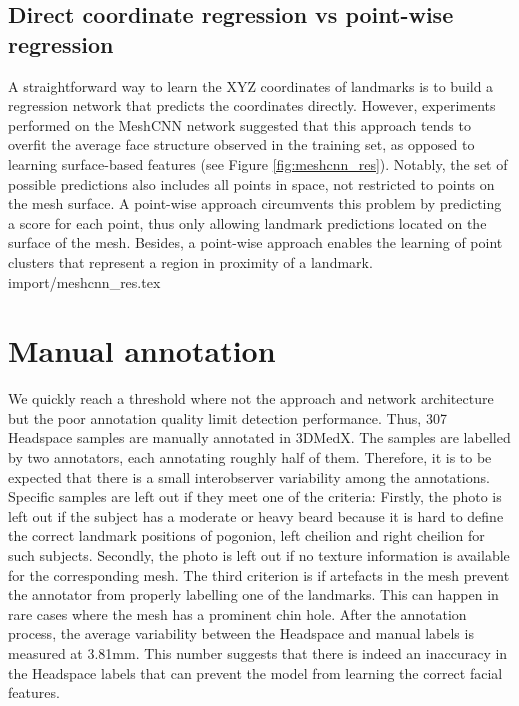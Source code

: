 \documentclass[class=article, crop=false]{standalone}
\begin{document}
\subsection{Direct coordinate regression vs point-wise regression}
\label{sec:coord_reg_vs_pw_reg}
A straightforward way to learn the XYZ coordinates of landmarks is to build a regression network that predicts the coordinates directly. However, experiments performed on the MeshCNN network suggested that this approach tends to overfit the average face structure observed in the training set, as opposed to learning surface-based features (see Figure \ref{fig:meshcnn_res}). Notably, the set of possible predictions also includes all points in space, not restricted to points on the mesh surface. A point-wise approach circumvents this problem by predicting a score for each point, thus only allowing landmark predictions located on the surface of the mesh. Besides, a point-wise approach enables the learning of point clusters that represent a region in proximity of a landmark.
{import/meshcnn_res.tex}



\section{Manual annotation}
\label{sec:app_manual_annotation}
We quickly reach a threshold where not the approach and network architecture but the poor annotation quality limit detection performance. Thus, 307 Headspace samples are manually annotated in 3DMedX. The samples are labelled by two annotators, each annotating roughly half of them. Therefore, it is to be expected that there is a small interobserver variability among the annotations. Specific samples are left out if they meet one of the criteria: Firstly, the photo is left out if the subject has a moderate or heavy beard because it is hard to define the correct landmark positions of pogonion, left cheilion and right cheilion for such subjects. Secondly, the photo is left out if no texture information is available for the corresponding mesh. The third criterion is if artefacts in the mesh prevent the annotator from properly labelling one of the landmarks. This can happen in rare cases where the mesh has a prominent chin hole.
After the annotation process, the average variability between the Headspace and manual labels is measured at 3.81mm. This number suggests that there is indeed an inaccuracy in the Headspace labels that can prevent the model from learning the correct facial features.
\end{document}
